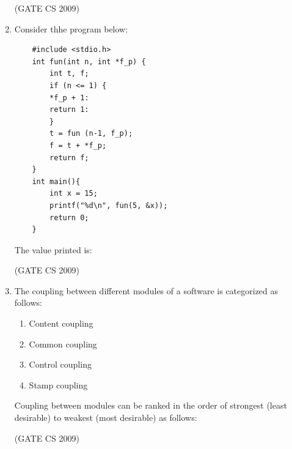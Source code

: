 \documentclass[a4paper, 11pt]{article}
\begin{document}
\begin{enumerate}
    \hfill (GATE CS 2009)

    \item Consider thhe program below:
    \begin{lstlisting}
    #include <stdio.h>
    int fun(int n, int *f_p) {
        int t, f;
        if (n <= 1) {
        *f_p + 1:
        return 1:
        }
        t = fun (n-1, f_p);
        f = t + *f_p;
        return f;
    }
    int main(){
        int x = 15;
        printf("%d\n", fun(5, &x));
        return 0;
    }
    \end{lstlisting}
    The value printed is:\\    
    \begin{enumerate}
    \end{enumerate}

    \hfill (GATE CS 2009)

    \item The coupling between different modules of a software is categorized as follows:
    \begin{enumerate}[label=\Roman*]
        \item Content coupling
        \item Common coupling 
        \item Control coupling
        \item Stamp coupling
    \end{enumerate}
    Coupling between modules can be ranked in the order of strongest (least desirable) to weakest (most desirable) as follows:\\
    \begin{enumerate}
    \end{enumerate}

    \hfill (GATE CS 2009)


\end{enumerate}
\end{document}
